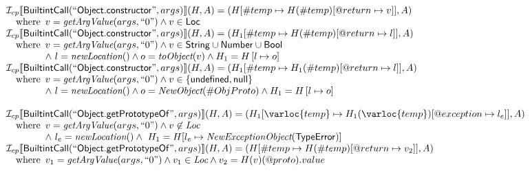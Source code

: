 \[
\begin{array}{l}

\I _{cp}\lbr \SF{BuiltintCall}(``\SF{Object.constructor}",args)\rbr(H,A)
  = (H[\#temp \mapsto H(\#temp)[@return \mapsto v]], A)\\
 \quad\wherec{
   v = \hf{getArgValue}(args, ``0") \land v \in \SF{Loc}}\\
   
\I _{cp}\lbr \SF{BuiltintCall}(``\SF{Object.constructor}",args)\rbr(H,A)
  = (H_1[\#temp \mapsto H(\#temp)[@return \mapsto l]], A)\\
 \quad\wherec{
   v = \hf{getArgValue}(args, ``0") \land v \in \SF{String} \cup \SF{Number} \cup \SF{Bool}\\
   \land\ l=\hf{newLocation}() \land o=\hf{toObject}(v) \land H_1=H\left[l\mapsto o\right]}\\

\I _{cp}\lbr \SF{BuiltintCall}(``\SF{Object.constructor}",args)\rbr(H,A)
  = (H_1[\#temp \mapsto H_1(\#temp)[@return \mapsto l]], A)\\
 \quad\wherec{
   v = \hf{getArgValue}(args, ``0") \land v \in \{ \SF{undefined}, \SF{null} \}\\
   \land\ l=\hf{newLocation}() \land o=\hf{NewObject}(\#ObjProto) \land H_1=H\left[l\mapsto o\right]}\\
\\


\I _{cp}\lbr \SF{BuiltintCall}(``\SF{Object.getPrototypeOf}",args)\rbr(H,A)
 = (H_1[\varloc{temp}\mapsto H_1(\varloc{temp})[\varprop{exception}\mapsto l_{e}]], A) \\
\quad\wherec{
  v = \hf{getArgValue}(args, ``0") \land v\not\in\Loc\\
  \land\ l_e = \hf{newLocation}() \land\ H_1=H[l_e\mapsto\hf{NewExceptionObject}(\SF{TypeError})] }\\

\I _{cp}\lbr \SF{BuiltintCall}(``\SF{Object.getPrototypeOf}",args)\rbr(H,A)
 = (H[\#temp \mapsto H(\#temp)[@return \mapsto v_2]], A)\\
 \quad\wherec{
  v_1 = \hf{getArgValue}(args, ``0") \land v_1 \in\Loc \land v_2 = H(v)(@proto).value}\\
\\  

\end{array}
\]

